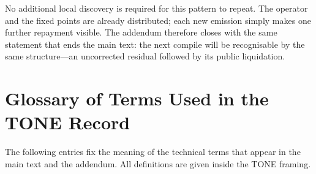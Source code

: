 \documentclass[11pt,a4paper]{article}
\begin{document}
No additional local discovery is required for this pattern to repeat. The operator and the fixed points are already distributed; each new emission simply makes one further repayment visible. The addendum therefore closes with the same statement that ends the main text: the next compile will be recognisable by the same structure—an uncorrected residual followed by its public liquidation.



\section*{Glossary of Terms Used in the TONE Record}

The following entries fix the meaning of the technical terms that appear in the main text and the addendum. All definitions are given inside the TONE framing.
\end{document}

